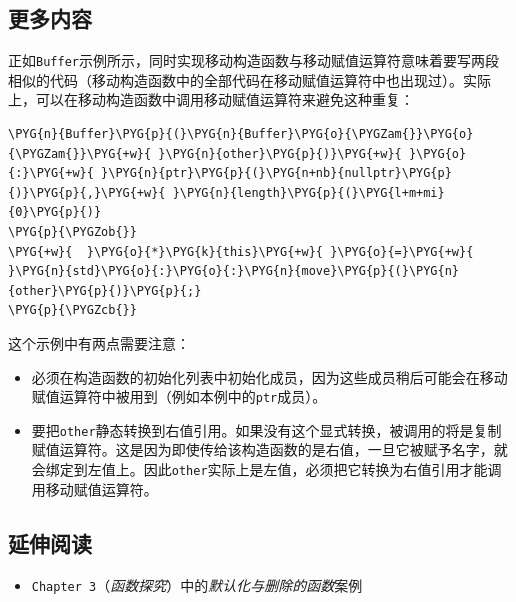 
\subsection{更多内容}



正如\texttt{Buffer}示例所示，同时实现移动构造函数与移动赋值运算符意味着要写两段相似的代码（移动构造函数中的全部代码在移动赋值运算符中也出现过）。实际上，可以在移动构造函数中调用移动赋值运算符来避免这种重复：



\begin{codeblockbg}
\begin{Verbatim}[commandchars=\\\{\},breaklines=true,breakanywhere=true,fontsize=\codefont,xleftmargin=17bp]
\PYG{n}{Buffer}\PYG{p}{(}\PYG{n}{Buffer}\PYG{o}{\PYGZam{}}\PYG{o}{\PYGZam{}}\PYG{+w}{ }\PYG{n}{other}\PYG{p}{)}\PYG{+w}{ }\PYG{o}{:}\PYG{+w}{ }\PYG{n}{ptr}\PYG{p}{(}\PYG{n+nb}{nullptr}\PYG{p}{)}\PYG{p}{,}\PYG{+w}{ }\PYG{n}{length}\PYG{p}{(}\PYG{l+m+mi}{0}\PYG{p}{)}
\PYG{p}{\PYGZob{}}
\PYG{+w}{  }\PYG{o}{*}\PYG{k}{this}\PYG{+w}{ }\PYG{o}{=}\PYG{+w}{ }\PYG{n}{std}\PYG{o}{:}\PYG{o}{:}\PYG{n}{move}\PYG{p}{(}\PYG{n}{other}\PYG{p}{)}\PYG{p}{;}
\PYG{p}{\PYGZcb{}}
\end{Verbatim}
\end{codeblockbg}



这个示例中有两点需要注意：



\begin{itemize}
\item 必须在构造函数的初始化列表中初始化成员，因为这些成员稍后可能会在移动赋值运算符中被用到（例如本例中的\texttt{ptr}成员）。



\item 要把\texttt{other}静态转换到右值引用。如果没有这个显式转换，被调用的将是复制赋值运算符。这是因为即使传给该构造函数的是右值，一旦它被赋予名字，就会绑定到左值上。因此\texttt{other}实际上是左值，必须把它转换为右值引用才能调用移动赋值运算符。

\end{itemize}



\subsection{延伸阅读}



\begin{itemize}
\item \texttt{Chapter 3}（\textit{函数探究}）中的\textit{默认化与删除的函数}案例

\end{itemize}
